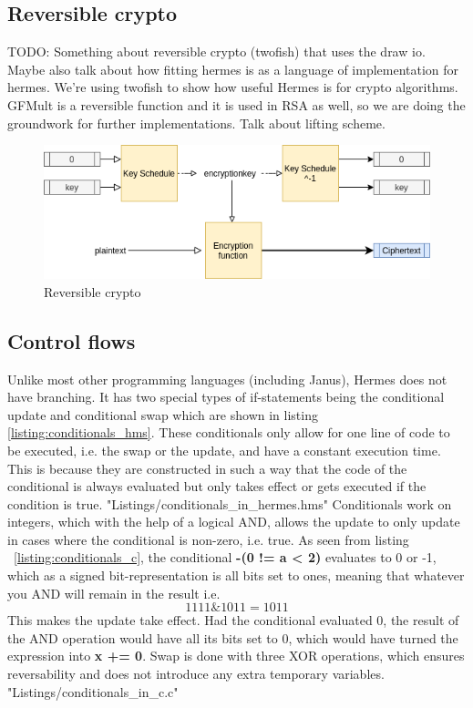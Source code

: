 \subsection{Reversible crypto}
TODO: Something about reversible crypto (twofish) that uses the draw io. Maybe also talk about how fitting hermes is as a language of implementation for hermes. We're using twofish to show how useful Hermes is for crypto algorithms. GFMult is a reversible function and it is used in RSA as well, so we are doing the groundwork for further implementations. Talk about lifting scheme.
\begin{figure}[htp]
  \centering
  \includegraphics[scale=0.6]{Graphics/asymmetric_crypto.png}
  \caption{Reversible crypto}
  \label{fig:reversible_crypto}
\end{figure}

\subsection{Control flows}
Unlike most other programming languages (including Janus), Hermes does not have branching. It has two special types of if-statements being the conditional update and conditional swap which are shown in listing \ref{listing:conditionals_hms}. These conditionals only allow for one line of code to be executed, i.e. the swap or the update, and have a constant execution time. This is because they are constructed in such a way that the code of the conditional is always evaluated but only takes effect or gets executed if the condition is true.
 {"Listings/conditionals_in_hermes.hms"}
Conditionals work on integers, which with the help of a logical AND, allows the update to only update in cases where the conditional is non-zero, i.e. true. As seen from listing ~\ref{listing:conditionals_c}, the conditional \textbf{-(0 != a < 2)} evaluates to 0 or -1, which as a signed bit-representation is all bits set to ones, meaning that whatever you AND will remain in the result i.e.
\begin{equation*}
  1111 \& 1011 = 1011
\end{equation*}
This makes the update take effect. Had the conditional evaluated 0, the result of the AND operation would have all its bits set to 0, which would have turned the expression into \textbf{x += 0}.
Swap is done with three XOR operations, which ensures reversability and does not introduce any extra temporary variables.
 {"Listings/conditionals_in_c.c"}

